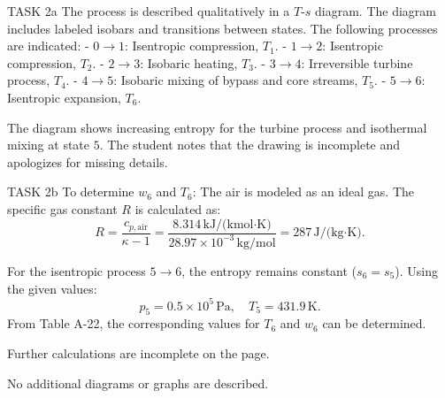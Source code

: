 TASK 2a  
The process is described qualitatively in a \( T \)-\( s \) diagram. The diagram includes labeled isobars and transitions between states. The following processes are indicated:  
- \( 0 \to 1 \): Isentropic compression, \( T_1 \).  
- \( 1 \to 2 \): Isentropic compression, \( T_2 \).  
- \( 2 \to 3 \): Isobaric heating, \( T_3 \).  
- \( 3 \to 4 \): Irreversible turbine process, \( T_4 \).  
- \( 4 \to 5 \): Isobaric mixing of bypass and core streams, \( T_5 \).  
- \( 5 \to 6 \): Isentropic expansion, \( T_6 \).  

The diagram shows increasing entropy for the turbine process and isothermal mixing at state \( 5 \). The student notes that the drawing is incomplete and apologizes for missing details.  

TASK 2b  
To determine \( w_6 \) and \( T_6 \):  
The air is modeled as an ideal gas. The specific gas constant \( R \) is calculated as:  
\[
R = \frac{c_{p,\text{air}}}{\kappa - 1} = \frac{8.314 \, \text{kJ/(kmol·K)}}{28.97 \times 10^{-3} \, \text{kg/mol}} = 287 \, \text{J/(kg·K)}.
\]  

For the isentropic process \( 5 \to 6 \), the entropy remains constant (\( s_6 = s_5 \)). Using the given values:  
\[
p_5 = 0.5 \times 10^5 \, \text{Pa}, \quad T_5 = 431.9 \, \text{K}.
\]  
From Table A-22, the corresponding values for \( T_6 \) and \( w_6 \) can be determined.  

Further calculations are incomplete on the page.  

No additional diagrams or graphs are described.